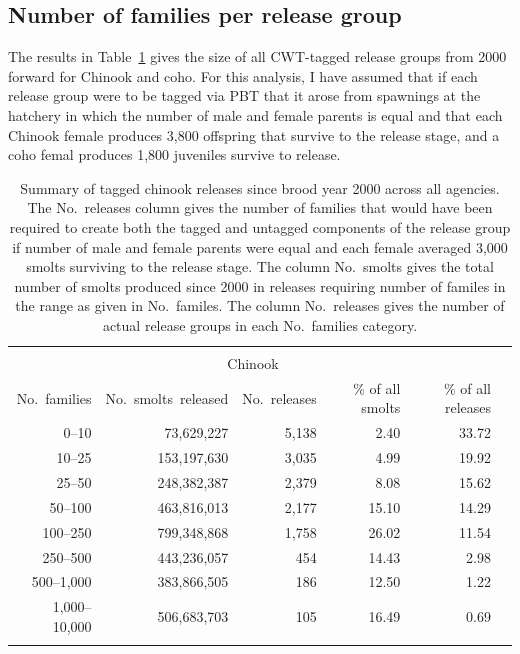 \documentclass[11pt]{article}
\begin{document}
\subsection{Number of families per release group}
The results in Table~\ref{tab:relsummary} gives the size of all CWT-tagged release groups from 2000 forward for
Chinook and coho.  For this analysis, I have assumed that if each release group
were to be tagged via PBT that it arose from spawnings at the hatchery in which the number of male
and female parents is equal and that each Chinook female produces 3,800 offspring that survive to the release stage, and
a coho femal produces 1,800 juveniles survive to release.


\begin{table}
\caption{Summary of tagged chinook releases since brood year 2000 across all agencies.
The No.~releases column gives the number of families that would have been required to
create both the tagged and untagged components of the release group if number of male and female parents were equal and each female
averaged 3,000 smolts surviving to the release stage. The column No.~smolts gives the total number of smolts produced since 2000
in releases requiring number of familes in the range as given in No.~familes.  The column No.~releases gives the number of 
actual release groups in each No.~families category. \label{tab:relsummary}}
\begin{center}
\begin{tabular}{rrrrrr}
\hline\hline
\\
\multicolumn{5}{c}{Chinook}\\
No.~families  &  No.~smolts~released  &  No.~releases  &  \% of all smolts  &  \% of all releases \\ \hline
0--10  &   73,629,227  &  5,138  &  2.40  &  33.72\\
10--25  &  153,197,630  &  3,035  &  4.99  &  19.92\\
25--50  &  248,382,387  &  2,379  &  8.08  &  15.62\\
50--100  &  463,816,013  &  2,177  &  15.10  &  14.29\\
100--250  &  799,348,868  &  1,758  &  26.02  &  11.54\\
250--500  &  443,236,057  &    454  &  14.43  &  2.98\\
500--1,000  &  383,866,505  &    186  &  12.50  &  1.22\\
1,000--10,000  &  506,683,703  &    105  &  16.49  &  0.69\\\hline
\\

\end{tabular}
\end{center}
\end{table}
\end{document}
